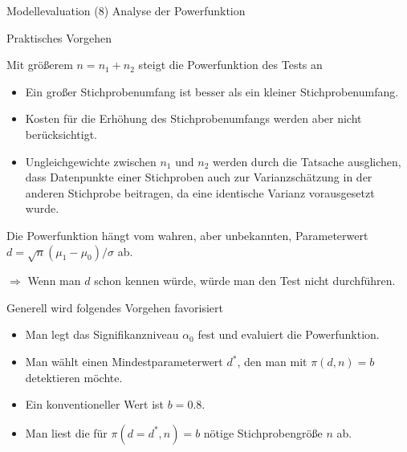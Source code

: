 \documentclass[
  8pt,
  ignorenonframetext,
]{beamer}
\begin{document}
\begin{frame}{Modellevaluation}
\protect\hypertarget{modellevaluation-37}{}
\noindent (8) Analyse der Powerfunktion

\small

Praktisches Vorgehen

Mit größerem \(n = n_1 + n_2\) steigt die Powerfunktion des Tests an

\begin{itemize}
\item
  Ein großer Stichprobenumfang ist besser als ein kleiner
  Stichprobenumfang.
\item
  Kosten für die Erhöhung des Stichprobenumfangs werden aber nicht
  berücksichtigt.
\item
  \justifying Ungleichgewichte zwischen \(n_1\) und \(n_2\) werden durch
  die Tatsache ausglichen, dass Datenpunkte einer Stichproben auch zur
  Varianzschätzung in der anderen Stichprobe beitragen, da eine
  identische Varianz vorausgesetzt wurde.
\end{itemize}

\vspace{1mm}

Die Powerfunktion hängt vom wahren, aber unbekannten, Parameterwert
\(d = \sqrt{n}(\mu_1 - \mu_0)/\sigma\) ab.

\(\Rightarrow\) Wenn man \(d\) schon kennen würde, würde man den Test
nicht durchführen.

\vspace{1mm}

Generell wird folgendes Vorgehen favorisiert

\begin{itemize}
\item
  Man legt das Signifikanzniveau \(\alpha_0\) fest und evaluiert die
  Powerfunktion.
\item
  Man wählt einen Mindestparameterwert \(d^*\), den man mit
  \(\pi(d,n) = b\) detektieren möchte.
\item
  Ein konventioneller Wert ist \(b= 0.8\).
\item
  Man liest die für \(\pi(d = d^*,n) = b\) nötige Stichprobengröße \(n\)
  ab.
\end{itemize}
\end{frame}
\end{document}
